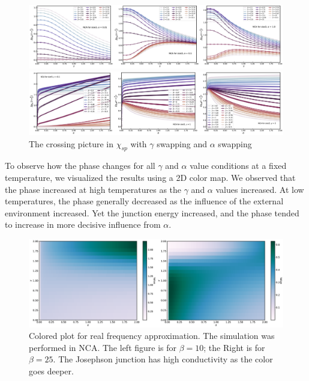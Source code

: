 \documentclass{article}[12pt]
\begin{document}
\begin{spacing}{1.3}
\begin{figure}[H]
  \centerline{\includegraphics[width=15cm]{TexFigure/4/4_4_01_chi_gam_swp.png}}
  \centerline{\includegraphics[width=15cm]{TexFigure/4/4_4_02_chi_alp_swp.png}}
  \caption{The crossing picture in $\chi_{sp}$ with $\gamma$ swapping and $\alpha$ swapping}
\end{figure}
\pagebreak
To observe how the phase changes for all $\gamma$ and $\alpha$ value conditions at a fixed temperature, 
we visualized the results using a 2D color map.  
We observed that the phase increased at high temperatures as the $\gamma$ and $\alpha$ values increased. 
At low temperatures, the phase generally decreased as the influence of the external environment increased. 
Yet the junction energy increased, and the phase tended to increase in more decisive influence from $\alpha$.
\begin{figure}[H]
  \centerline{\includegraphics[width=13cm]{TexFigure/4/4_4_03_chi_color.png}}
  \caption{Colored plot for real frequency approximation. The simulation was performed in NCA. The left figure is for $\beta=10$; the Right is for $\beta=25$.
  The Josephson junction has high conductivity as the color goes deeper.}
 \end{figure}
\pagebreak

\end{spacing}
\end{document}
